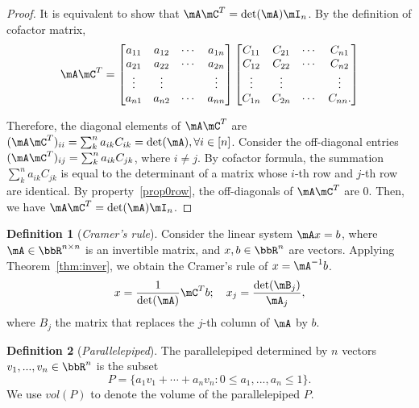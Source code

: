 \documentclass[11pt]{article}
\theoremstyle{plain}
\theoremstyle{definition}
\newtheorem{defn}{Definition}
\begin{document}
\begin{proof}
	It is equivalent to  show that $\mA \mC^T = \det(\mA) \mI_n$. By the definition of cofactor matrix,
	\begin{align}
		\mA  \mC^T = \begin{bmatrix}
			a_{11} & a_{12} &\cdots &a_{1n}\\
			a_{21} & a_{22} &\cdots &a_{2n}\\
			\vdots & \vdots & & \vdots\\
			a_{n1} & a_{n2} &\cdots &a_{nn}\\
		\end{bmatrix} \begin{bmatrix}
			C_{11} & C_{21} &\cdots &C_{n1}\\
			C_{12} & C_{22} &\cdots &C_{n2}\\
			\vdots & \vdots & & \vdots\\
			C_{1n} & C_{2n} &\cdots &C_{nn}.\\
		\end{bmatrix}
	\end{align}
	
	Therefore, the diagonal elements of $\mA \mC^T$ are $(\mA \mC^T)_{ii} = \sum_k^n a_{ik} C_{ik} = \det(\mA), \forall i \in [n]$. Consider the off-diagonal entries $(\mA \mC^T)_{ij} = \sum_{k}^n a_{ik} C_{jk}$, where $i \neq j$. By cofactor formula, the summation   $ \sum_{k}^n a_{ik} C_{jk}$ is equal to the determinant of a matrix whose $i$-th row and $j$-th row are identical. By property~\ref{prop0row}, the off-diagonals of $\mA \mC^T$ are 0. Then, we have $\mA \mC^T = \det(\mA) \mI_n$.
\end{proof}

\begin{defn}[\textit{Cramer's rule}]
Consider the linear system $\mA x=b$, where $\mA\in\bbR^{n \times n}$ is an invertible matrix, and $ x, b \in \bbR^n$ are vectors. Applying Theorem~\ref{thm:inver}, we obtain the Cramer's rule of $x = \mA^{-1} b$.
\[  x = \frac{1}{\det(\mA)} \mC^T b; \quad x_j = \frac{\det(\mB_j)}{\mA_j}, \] 
	where $B_j$ the matrix that replaces the $j$-th column of $\mA$ by $b$.
\end{defn}

\begin{defn}[\textit{Parallelepiped}]
	The parallelepiped determined by $n$ vectors $v_1,...,v_n \in \bbR^n$ is the subset 
	\[ P = \{ a_1 v_1 + \cdots + a_n v_n \colon 0 \leq a_1,...,a_n \leq 1 \}. \]
	 We use $vol(P)$ to denote the volume of the parallelepiped  $P$. 
\end{defn}
\end{document}
